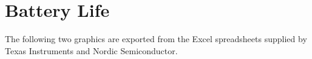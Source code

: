 \section{Battery Life} %
\label{sec:battery_life_appendix}

The following two graphics are exported from the Excel spreadsheets supplied by Texas Instruments and Nordic Semiconductor.

